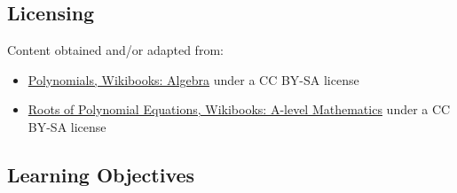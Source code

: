 \subsection{Licensing}
\label{sss:lice-7352}




Content obtained and/or adapted from:



\begin{itemize}
    \item \href{https://en.wikibooks.org/wiki/Algebra/Polynomials}{Polynomials, Wikibooks: Algebra} under a CC BY-SA license
    \item \href{https://en.wikibooks.org/wiki/A-level_Mathematics/OCR/FP1/Roots_of_Polynomial_Equations}{Roots of Polynomial Equations, Wikibooks: A-level Mathematics} under a CC BY-SA license
\end{itemize}


\subsection{Learning Objectives}
\label{ssec:lear-fe6e}


